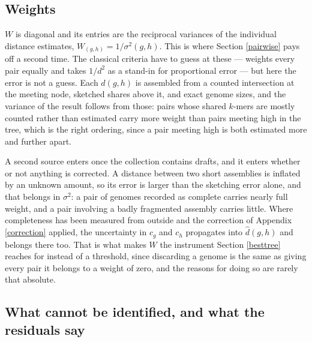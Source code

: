 \documentclass[pdflatex,sn-vancouver-num]{sn-jnl}
\begin{document}
\subsection{Weights}

$W$ is diagonal and its entries are the reciprocal variances of the individual distance estimates,
$W_{(g,h)} = 1 / \sigma^2(g,h)$. This is where Section \ref{pairwise} pays off a second time. The
classical criteria have to guess at these --- \cite{cavalli1967phylogenetic} weights every pair
equally and \cite{fitch1967construction} takes $1/d^2$ as a stand-in for proportional error --- but
here the error is not a guess. Each $\widehat{d}(g,h)$ is assembled from a counted intersection at
the meeting node, sketched shares above it, and exact genome sizes, and the variance of the result
follows from those: pairs whose shared $k$-mers are mostly counted rather than estimated carry more
weight than pairs meeting high in the tree, which is the right ordering, since a pair meeting high
is both estimated more and further apart.

A second source enters once the collection contains drafts, and it enters whether or not anything is
corrected. A distance between two short assemblies is inflated by an unknown amount, so its error is
larger than the sketching error alone, and that belongs in $\sigma^2$: a pair of genomes recorded as
complete carries nearly full weight, and a pair involving a badly fragmented assembly carries little.
Where completeness has been measured from outside and the correction of Appendix \ref{correction}
applied, the uncertainty in $c_g$ and $c_h$ propagates into $\widehat{d}(g,h)$ and belongs there too. That is what makes $W$ the instrument Section \ref{besttree} reaches for
instead of a threshold, since discarding a genome is the same as giving every pair it belongs to a
weight of zero, and the reasons for doing so are rarely that absolute.

\subsection{What cannot be identified, and what the residuals say}\label{identify}
\end{document}
